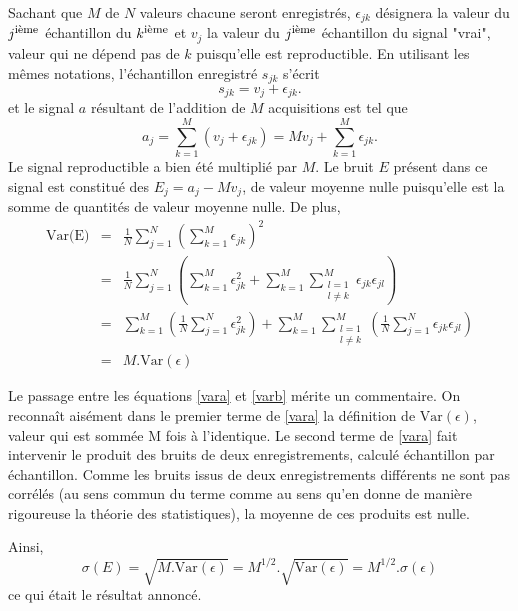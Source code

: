 Sachant que $M$ {\FID} de $N$ valeurs chacune seront enregistrés, $\epsilon_{jk}$
désignera la valeur du $j\mieme$ échantillon 
du $k\mieme$ {\FID} et
$v_j$ la valeur du $j\mieme$ échantillon du signal "vrai", 
valeur qui ne dépend pas de $k$ puisqu'elle est reproductible.
En utilisant les mêmes notations, l'échantillon enregistré $s_{jk}$ s'écrit
\begin{equation}
s_{jk} = v_j + \epsilon_{jk}.
\end{equation}
et le signal $a$ résultant de l'addition de $M$ acquisitions est tel que
\begin{equation}
a_j = \sum_{k=1}^{M}(v_j + \epsilon_{jk}) = Mv_j + \sum_{k=1}^{M}\epsilon_{jk}.
\end{equation}
Le signal reproductible a bien été multiplié par $M$.
Le bruit $E$ présent dans ce signal est constitué des $E_j = a_j - Mv_j$, de valeur moyenne
nulle puisqu'elle est la somme de quantités de valeur moyenne nulle.
De plus,
\begin{eqnarray}
\mbox{Var(E)} 
& = & \frac{1}{N}\sum_{j=1}^N\left( \sum_{k=1}^M \epsilon_{jk} \right)^2 \\
& = & \frac{1}{N}\sum_{j=1}^N\left( \sum_{k=1}^M \epsilon_{jk}^2 +
\sum_{k=1}^M \sum_{\substack{l=1  \\ l \neq k}}^M \epsilon_{jk}\epsilon_{jl} \right) \\
\label{vara} & = & \sum_{k=1}^M \left( \frac{1}{N}\sum_{j=1}^N \epsilon_{jk}^2 \right) +
\sum_{k=1}^M \sum_{\substack{l=1 \\ l \neq k}}^M
\left( \frac{1}{N}\sum_{j=1}^N\epsilon_{jk}\epsilon_{jl} \right) \\
\label{varb} & = & M.\mbox{Var}(\epsilon)
\end{eqnarray}

Le passage entre les équations \ref{vara} et \ref{varb} mérite un commentaire.
On reconnaît aisément dans le premier terme de \ref{vara} la définition de 
$\mbox{Var}(\epsilon)$, valeur qui est sommée M fois à l'identique.
Le second terme de \ref{vara} fait intervenir le produit des bruits de deux
enregistrements, calculé échantillon par échantillon.
Comme les bruits issus de deux enregistrements différents ne sont pas corrélés
(au sens commun du terme comme au sens qu'en donne de manière rigoureuse la
théorie des statistiques), la moyenne de ces produits est nulle.

Ainsi,
\begin{equation}
\sigma(E) = \sqrt{M.\mbox{Var}(\epsilon)} = 
M^{1/2}.\sqrt{\mbox{Var}(\epsilon)} = M^{1/2}.\sigma(\epsilon)
\end{equation}
ce qui était le résultat annoncé.

